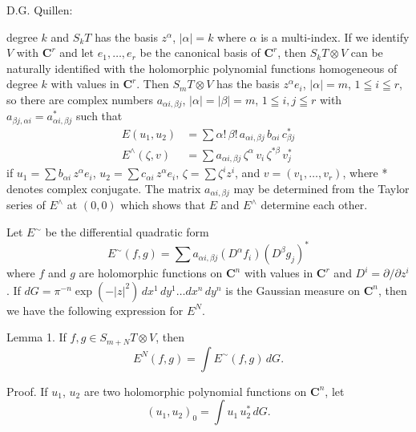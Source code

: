  \hfill D.G. Quillen:

degree $k$ and $S_k T$ has the basis $z^\alpha$, $|\alpha|=k$ where $\alpha$ is a multi-index. If we
identify $V$ with $\mathbf{C}^r$ and let $e_1,\dots,e_r$ be the canonical basis of $\mathbf{C}^r$, then
$S_k T\otimes V$ can be naturally identified with the holomorphic polynomial
functions homogeneous of degree $k$ with values in $\mathbf{C}^r$. Then $S_m T\otimes V$
has the basis $z^\alpha e_i$, $|\alpha|=m$, $1\leqq i\leqq r$, so there are complex numbers $a_{\alpha i,\beta j}$,
$|\alpha|=|\beta|=m$, $1\leqq i, j\leqq r$ with $a_{\beta j,\alpha i}=a^*_{\alpha i,\beta j}$ such that
\[
\begin{aligned}
E(u_1,u_2)&=\sum \alpha!\,\beta!\,a_{\alpha i,\beta j}\,b_{\alpha i}\,c^*_{\beta j}\\
E^\wedge(\zeta,v)&=\sum a_{\alpha i,\beta j}\,\zeta^\alpha\,v_i\,\zeta^{*\beta}\,v^*_j
\end{aligned}
\tag{2}
\]
if $u_1=\sum b_{\alpha i}\,z^\alpha e_i$, $u_2=\sum c_{\alpha i}\,z^\alpha e_i$, $\zeta=\sum \zeta^i z^i$, and $v=(v_1,\dots,v_r)$, where *
denotes complex conjugate. The matrix $a_{\alpha i,\beta j}$ may be determined from
the Taylor series of $E^\wedge$ at $(0,0)$ which shows that $E$ and $E^\wedge$ determine
each other.

Let $E^\sim$ be the differential quadratic form
\[
E^\sim(f,g)=\sum a_{\alpha i,\beta j}(D^\alpha f_i)(D^\beta g_j)^*
\]
where $f$ and $g$ are holomorphic functions on $\mathbf{C}^n$ with values in $\mathbf{C}^r$ and
$D^i=\partial/\partial z^i$. If $dG=\pi^{-n}\exp(-|z|^2)\,dx^1\,dy^1\dots dx^n\,dy^n$ is the Gaussian
measure on $\mathbf{C}^n$, then we have the following expression for $E^N$.

Lemma 1. If $f,g\in S_{m+N}T\otimes V$, then
\[
E^N(f,g)=\int E^\sim(f,g)\,dG.
\]

Proof. If $u_1$, $u_2$ are two holomorphic polynomial functions on $\mathbf{C}^n$, let
\[
(u_1,u_2)_0=\int u_1\,u_2^*\,dG.
\]

